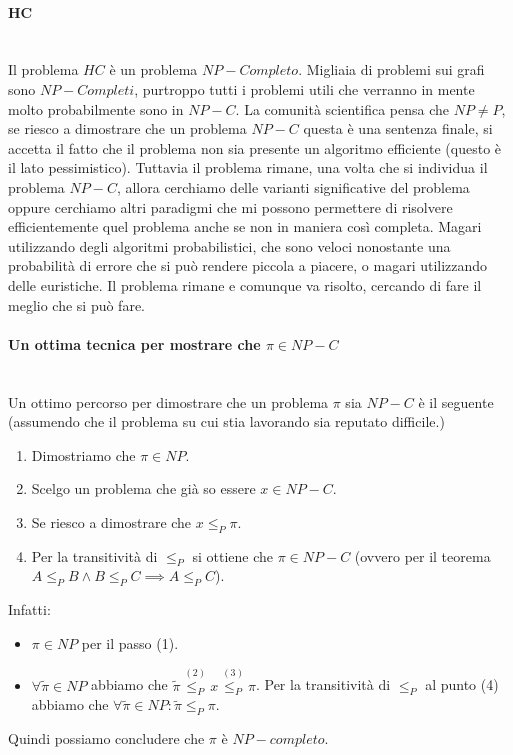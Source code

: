 \documentclass{article}
\begin{document}
\paragraph{HC}\mbox{}\\
Il problema $HC$ è un problema $NP-Completo$. Migliaia di problemi sui grafi sono
$NP-Completi$, purtroppo tutti i problemi utili che verranno in mente molto probabilmente
sono in $NP-C$.
\newline\newline
La comunità scientifica pensa che $NP\neq P$, se riesco a dimostrare che un problema
$NP-C$ questa è una sentenza finale, si accetta il fatto che il problema non sia presente
un algoritmo efficiente (questo è il lato pessimistico).
\newline\newline
Tuttavia il problema rimane, una volta che si individua il problema $NP-C$, allora cerchiamo
delle varianti significative del problema oppure cerchiamo altri paradigmi che mi possono
permettere di risolvere efficientemente quel problema anche se non in maniera così completa.
Magari utilizzando degli algoritmi probabilistici, che sono veloci nonostante una probabilità
di errore che si può rendere piccola a piacere, o magari utilizzando delle euristiche.
\newline\newline
Il problema rimane e comunque va risolto, cercando di fare il meglio che si può fare.

\paragraph{Un ottima tecnica per mostrare che $\pi\in NP-C$}\mbox{}\\
Un ottimo percorso per dimostrare che un problema $\pi$ sia $NP-C$ è il seguente 
(assumendo che il problema su cui stia lavorando sia reputato difficile.)
\begin{enumerate}
    \item Dimostriamo che $\pi\in NP$.
    \item Scelgo un problema che già so essere $x\in NP-C$.
    \item Se riesco a dimostrare che $x\leq_P \pi$.
    \item Per la transitività di $\leq_P$ si ottiene che $\pi\in NP-C$ (ovvero
          per il teorema $A\leq_P B\land B\leq_P C\implies A\leq_P C$).
\end{enumerate}
Infatti:
\begin{itemize}
    \item $\pi\in NP$ per il passo (1).
    \item $\forall\tilde{\pi}\in NP$ abbiamo che
          $\tilde{\pi}\overset{(2)}{\leq_P}x\overset{(3)}{\leq_P}\pi$. Per la transitività
          di $\leq_P$ al punto (4) abbiamo che $\forall\tilde{\pi}\in NP:\tilde{\pi}\leq_P\pi$.
\end{itemize}
Quindi possiamo concludere che $\pi$ è $NP-completo$.
\end{document}
